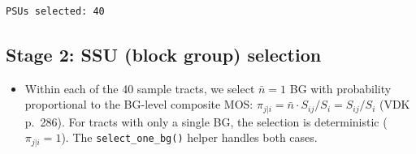 \documentclass[
  11pt,
]{article}
\providecommand{\tightlist}{%
  \setlength{\itemsep}{0pt}\setlength{\parskip}{0pt}}\usepackage{longtable,booktabs,array}
\begin{document}
\begin{verbatim}
PSUs selected: 40 
\end{verbatim}

\subsection{Stage 2: SSU (block group)
selection}\label{stage-2-ssu-block-group-selection}

\begin{itemize}
\tightlist
\item
  Within each of the 40 sample tracts, we select \(\bar{n} = 1\) BG with
  probability proportional to the BG-level composite MOS:
  \(\pi_{j|i} = \bar{n} \cdot S_{ij} / S_i = S_{ij} / S_i\) (VDK
  p.~286). For tracts with only a single BG, the selection is
  deterministic (\(\pi_{j|i} = 1\)). The \texttt{select\_one\_bg()}
  helper handles both cases.
\end{itemize}
\end{document}
